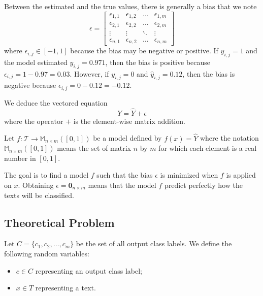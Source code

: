 \documentclass{article}
\begin{document}
Between the estimated and the true values, there is generally a bias that we note
\begin{equation} \label{eq:BiasMatrix}
\epsilon =\begin{bmatrix}
	    \epsilon_{1,1}      & \epsilon_{1,2}      & \ldots & \epsilon_{1,m} \\
	    \epsilon_{2,1} & \epsilon_{2,2} & \ldots & \epsilon_{2,m} \\
	    \vdots       & \vdots        & \ddots & \vdots \\
	    \epsilon_{n,1}  & \epsilon_{n,2}  & \ldots & \epsilon_{n,m}
	\end{bmatrix}
\end{equation}
where $\epsilon_{i,j} \in [-1, 1]$ because the bias may be negative or positive. If $y_{i,j} = 1$ and the model estimated $\widehat{y}_{i,j} = 0.971$, then the bias is positive because $\epsilon_{i,j} = 1 - 0.97 = 0.03$. However, if $y_{i,j} = 0$ and $\widehat{y}_{i,j} = 0.12$, then the bias is negative because $\epsilon_{i,j} = 0 - 0.12 = -0.12$.

We deduce the vectored equation 
\begin{equation}
	Y = \widehat{Y} + \epsilon
\end{equation}
where the operator $+$ is the element-wise matrix addition.

Let $f : \mathcal{T} \longrightarrow \mathbb{M}_{n \times m}([0,1])$ be a model defined by $f(x) = \widehat{Y}$ where the notation $\mathbb{M}_{n \times m}([0,1])$ means the set of matrix $n$ by $m$ for which each element is a real number in $[0,1]$.

The goal is to find a model $f$ such that the bias $\epsilon$ is minimized when $f$ is applied on $x$. Obtaining $\epsilon = \mathbf{0}_{n \times m}$ means that the model $f$ predict perfectly how the texts will be classified.


\subsection{Theoretical Problem}
Let $C = \{c_1,c_2,\ldots, c_m\}$ be the set of all output class labels. We define the following random variables:
\begin{itemize}
	\item $c \in C$ representing an output class label;
	\item $x \in T$ representing a text.
\end{itemize}
\end{document}
